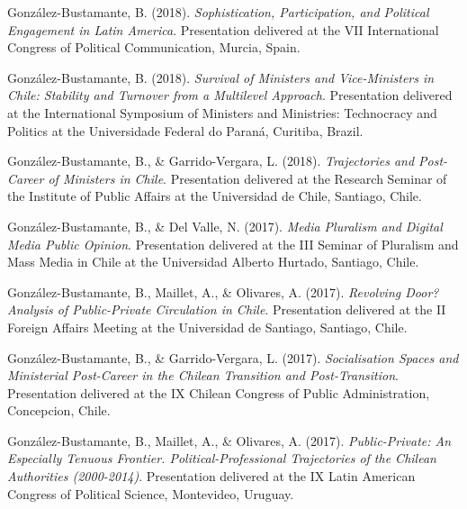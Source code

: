 \begin{publications}
\begin{benumerate}{72}
\item{\small González-Bustamante, B. (2018). {\itshape Sophistication, Participation, and Political Engagement in Latin America}. Presentation delivered at the VII International Congress of Political Communication, Murcia, Spain.}\vspace{1mm}

\item{\small González-Bustamante, B. (2018). {\itshape Survival of Ministers and Vice-Ministers in Chile: Stability and Turnover from a Multilevel Approach}. Presentation delivered at the International Symposium of Ministers and Ministries: Technocracy and Politics at the Universidade Federal do Paraná, Curitiba, Brazil.}\vspace{1mm}

\item{\small González-Bustamante, B., \& Garrido-Vergara, L. (2018). {\itshape Trajectories and Post-Career of Ministers in Chile}. Presentation delivered at the Research Seminar of the Institute of Public Affairs at the Universidad de Chile, Santiago, Chile.}\vspace{1mm}

\item{\small González-Bustamante, B., \& Del Valle, N. (2017). {\itshape Media Pluralism and Digital Media Public Opinion}. Presentation delivered at the III Seminar of Pluralism and Mass Media in Chile at the Universidad Alberto Hurtado, Santiago, Chile.}\vspace{1mm}

\item{\small González-Bustamante, B., Maillet, A., \& Olivares, A. (2017). {\itshape Revolving Door? Analysis of Public-Private Circulation in Chile}. Presentation delivered at the II Foreign Affairs Meeting at the Universidad de Santiago, Santiago, Chile.}\vspace{1mm}

\item{\small González-Bustamante, B., \& Garrido-Vergara, L. (2017). {\itshape Socialisation Spaces and Ministerial Post-Career in the Chilean Transition and Post-Transition}. Presentation delivered at the IX Chilean Congress of Public Administration, Concepcion, Chile.}\vspace{1mm}

\item{\small González-Bustamante, B., Maillet, A., \& Olivares, A. (2017). {\itshape Public-Private: An Especially Tenuous Frontier. Political-Professional Trajectories of the Chilean Authorities (2000-2014)}. Presentation delivered at the IX Latin American Congress of Political Science, Montevideo, Uruguay.}\vspace{1mm}


\end{benumerate}
\end{publications}

